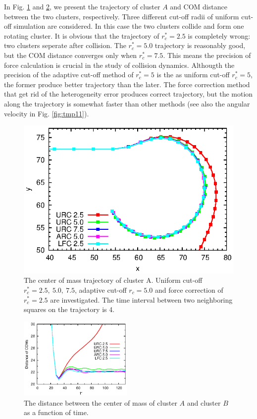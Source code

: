 \documentclass[aps,pre,preprint]{revtex4}
\begin{document}
In Fig. \ref{fig:tmp8} and \ref{fig:tmp9}, we present the trajectory
of cluster $A$ and COM distance between the two clusters,
respectively. Three different cut-off radii of uniform cut-off
simulation are considered. In this case the two clusters collide and
form one rotating cluster. It is obvious that the trajectory of
$r_c^\ast = 2.5$ is completely wrong: two clusters seperate after
collision. The $r_c^\ast = 5.0$ trajectory is reasonably good, but the
COM distance converges only when $r_c^\ast = 7.5$. This means the
precision of force calculation is crucial in the study of collision
dynamics. Althougth the precision of the adaptive cut-off method of
$r_c^\ast = 5$ is the as uniform cut-off $r_c^\ast = 5$, the former
produce better trajectory than the later. The force correction method
that get rid of the heterogeneity error produces correct trajectory,
but the motion along the trajectory is somewhat faster than other
methods (see also the angular velocity in Fig. \ref{fig:tmp11}).

\begin{figure}
  \centering
  \includegraphics[]{fig/trajs.eps}
  \caption{The center of mass trajectory of cluster A. Uniform cut-off
    $r_c^\ast = 2.5,\ 5.0,\ 7.5$, adaptive cut-off $r_c = 5.0$ and
    force correction of $r^\ast_c = 2.5$ are investigated.  The time
    interval between two neighboring squares on the trajectory is 4.
  }
  \label{fig:tmp8}
\end{figure}

\begin{figure}
  \centering
  \includegraphics[width=0.49\textwidth]{fig/dists.eps}
  \caption{The distance between the center of mass of cluster $A$ and
    cluster $B$ as a function of time.}
  \label{fig:tmp9}
\end{figure}
\end{document}
